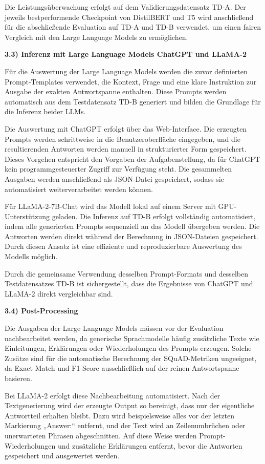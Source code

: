 \documentclass[12pt,oneside]{article}
\begin{document}
Die Leistungsüberwachung erfolgt auf dem Validierungsdatensatz TD-A. Der
jeweils bestperformende Checkpoint von DistilBERT und T5 wird
anschließend für die abschließende Evaluation auf TD-A und TD-B
verwendet, um einen fairen Vergleich mit den Large Language Models zu
ermöglichen.

\textbf{3.3) Inferenz mit Large Language Models ChatGPT und LLaMA-2}

Für die Auswertung der Large Language Models werden die zuvor
definierten Prompt-Templates verwendet, die Kontext, Frage und eine
klare Instruktion zur Ausgabe der exakten Antwortspanne enthalten. Diese
Prompts werden automatisch aus dem Testdatensatz TD-B generiert und
bilden die Grundlage für die Inferenz beider LLMs.

Die Auswertung mit ChatGPT erfolgt über das Web-Interface. Die erzeugten
Prompts werden schrittweise in die Benutzeroberfläche eingegeben, und
die resultierenden Antworten werden manuell in strukturierter Form
gespeichert. Dieses Vorgehen entspricht den Vorgaben der
Aufgabenstellung, da für ChatGPT kein programmgesteuerter Zugriff zur
Verfügung steht. Die gesammelten Ausgaben werden anschließend als
JSON-Datei gespeichert, sodass sie automatisiert weiterverarbeitet
werden können.

Für LLaMA-2-7B-Chat wird das Modell lokal auf einem Server mit
GPU-Unterstützung geladen. Die Inferenz auf TD-B erfolgt vollständig
automatisiert, indem alle generierten Prompts sequenziell an das Modell
übergeben werden. Die Antworten werden direkt während der Berechnung in
JSON-Dateien gespeichert. Durch diesen Ansatz ist eine effiziente und
reproduzierbare Auswertung des Modells möglich.

Durch die gemeinsame Verwendung desselben Prompt-Formats und desselben
Testdatensatzes TD-B ist sichergestellt, dass die Ergebnisse von ChatGPT
und LLaMA-2 direkt vergleichbar sind.

\textbf{3.4) Post-Processing}

Die Ausgaben der Large Language Models müssen vor der Evaluation
nachbearbeitet werden, da generische Sprachmodelle häufig zusätzliche
Texte wie Einleitungen, Erklärungen oder Wiederholungen des Prompts
erzeugen. Solche Zusätze sind für die automatische Berechnung der
SQuAD-Metriken ungeeignet, da Exact Match und F1-Score ausschließlich
auf der reinen Antwortspanne basieren.

Bei LLaMA-2 erfolgt diese Nachbearbeitung automatisiert. Nach der
Textgenerierung wird der erzeugte Output so bereinigt, dass nur der
eigentliche Antwortteil erhalten bleibt. Dazu wird beispielsweise alles
vor der letzten Markierung „Answer:`` entfernt, und der Text wird an
Zeilenumbrüchen oder unerwarteten Phrasen abgeschnitten. Auf diese Weise
werden Prompt-Wiederholungen und zusätzliche Erklärungen entfernt, bevor
die Antworten gespeichert und ausgewertet werden.
\end{document}
